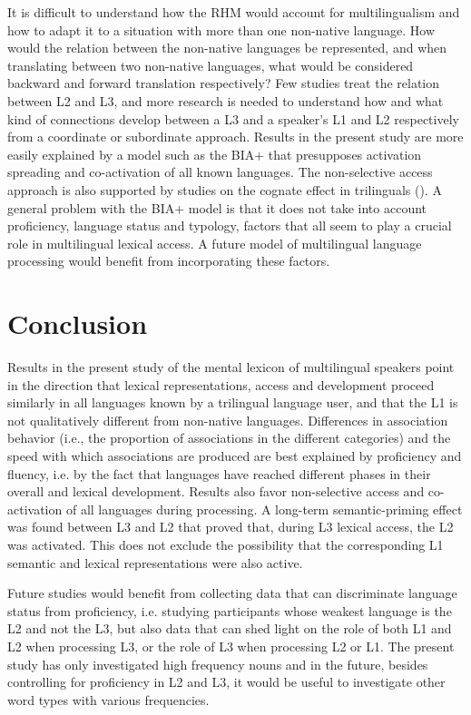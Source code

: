 \documentclass[output=paper,colorlinks,citecolor=brown,nonflat]{langsci/langscibook}
\begin{document}
It is difficult to understand how the RHM would account for multilingualism and how to adapt it to a situation with more than one non-native language. How would the relation between the non-native languages be represented, and when translating between two non-native languages, what would be considered backward and forward translation respectively? Few studies treat the relation between L2 and L3, and more research is needed to understand how and what kind of connections develop between a L3 and a speaker’s L1 and L2 respectively from a coordinate or subordinate approach. Results in the present study are more easily explained by a model such as the BIA+ that presupposes activation spreading and co-activation of all known languages. The non-selective access approach is also supported by studies on the cognate effect in trilinguals (\citealt{LemhöferEtAl2004, Szubko-Sitarek2011}). A general problem with the BIA+ model is that it does not take into account proficiency, language status and typology, factors that all seem to play a crucial role in multilingual lexical access. A future model of multilingual language processing would benefit from incorporating these factors.

\section{Conclusion}\label{sec:gudmundson:5}

Results in the present study of the mental lexicon of multilingual speakers point in the direction that lexical representations, access and development proceed similarly in all languages known by a trilingual language user, and that the L1 is not qualitatively different from non-native languages. Differences in association behavior (i.e., the proportion of associations in the different categories) and the speed with which associations are produced are best explained by proficiency and fluency, i.e. by the fact that languages have reached different phases in their overall and lexical development. Results also favor non-selective access and co-activation of all languages during processing. A long-term semantic-priming effect was found between L3 and L2 that proved that, during L3 lexical access, the L2 was activated. This does not exclude the possibility that the corresponding L1 semantic and lexical representations were also active.

Future studies would benefit from collecting data that can discriminate language status from proficiency, i.e. studying participants whose weakest language is the L2 and not the L3, but also data that can shed light on the role of both L1 and L2 when processing L3, or the role of L3 when processing L2 or L1. The present study has only investigated high frequency nouns and in the future, besides controlling for proficiency in L2 and L3, it would be useful to investigate other word types with various frequencies.

\sloppy\printbibliography[heading=subbibliography,notkeyword=this]
\end{document}
